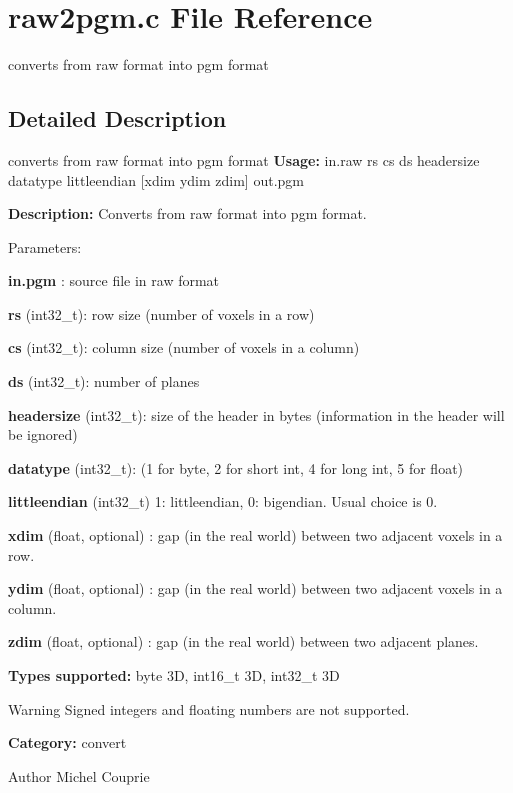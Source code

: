 \section{raw2pgm.c File Reference}
\label{raw2pgm_8c}


converts from raw format into pgm format  




\subsection{Detailed Description}
converts from raw format into pgm format {\bfseries Usage:} in.raw rs cs ds headersize datatype littleendian [xdim ydim zdim] out.pgm

{\bfseries Description:} Converts from raw format into pgm format.

Parameters: \begin{DoxyItemize}
\item {\bfseries in.pgm} : source file in raw format \item {\bfseries rs} (int32\_\-t): row size (number of voxels in a row) \item {\bfseries cs} (int32\_\-t): column size (number of voxels in a column) \item {\bfseries ds} (int32\_\-t): number of planes \item {\bfseries headersize} (int32\_\-t): size of the header in bytes (information in the header will be ignored) \item {\bfseries datatype} (int32\_\-t): (1 for byte, 2 for short int, 4 for long int, 5 for float) \item {\bfseries littleendian} (int32\_\-t) 1: littleendian, 0: bigendian. Usual choice is 0. \item {\bfseries xdim} (float, optional) : gap (in the real world) between two adjacent voxels in a row. \item {\bfseries ydim} (float, optional) : gap (in the real world) between two adjacent voxels in a column. \item {\bfseries zdim} (float, optional) : gap (in the real world) between two adjacent planes.\end{DoxyItemize}
{\bfseries Types supported:} byte 3D, int16\_\-t 3D, int32\_\-t 3D

\begin{DoxyWarning}{Warning}
Signed integers and floating numbers are not supported.
\end{DoxyWarning}
{\bfseries Category:} convert

\begin{DoxyAuthor}{Author}
Michel Couprie 
\end{DoxyAuthor}
